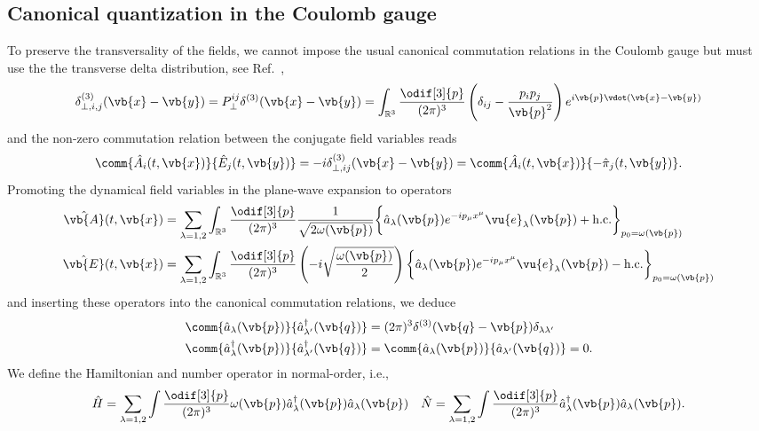 \subsection{Canonical quantization in the Coulomb gauge}

To preserve the transversality of the fields, we cannot impose the usual canonical commutation relations in the Coulomb gauge but must use the the transverse delta distribution, see Ref.~\cite[p.~197]{Greiner2013},
\begin{equation}
	\delta_{\perp,i,j}^{(3)}(\vb{x}-\vb{y})
	=
	P^{ij}_\perp
	\delta^{(3)}(\vb{x}-\vb{y})
	=
	\int_{\mathbb{R}^3}
	\frac{\odif[3]{p}}{(2\pi)^3}
	\left(
		\delta_{ij}
		-
		\frac{p_ip_j}{\vb{p}^2}
	\right)
	e^{i\vb{p}\vdot(\vb{x}-\vb{y})}
\end{equation}
and the non-zero commutation relation between the conjugate field variables reads
\begin{equation}
	\comm{\hat{A}_i(t,\vb{x})}{\hat{E}_j(t,\vb{y})}
	=
	-i
	\delta_{\perp,ij}^{(3)}(\vb{x}-\vb{y})
	=
	\comm{\hat{A}_i(t,\vb{x})}{-\hat\pi_j(t,\vb{y})}
	.
\end{equation}
Promoting the dynamical field variables in the plane-wave expansion to operators
\begin{align}
	\hat{\vb{A}}(t,\vb{x})
	&=
	\sum_{\lambda=1,2}
	\int_{\mathbb{R}^3}
	\frac{\odif[3]{p}}{(2\pi)^3}
	\frac{1}{\sqrt{2\omega(\vb{p})}}
	\biggl\{
		\hat{a}_{\lambda}(\vb{p})
		e^{-ip_\mu x^\mu}
		\vu{e}_\lambda(\vb{p})
		+
		\text{h.c.}
	\biggr\}_{p_0=\omega(\vb{p})}
	\\
	\hat{\vb{E}}(t,\vb{x})
	&=
	\sum_{\lambda=1,2}
	\int_{\mathbb{R}^3}
	\frac{\odif[3]{p}}{(2\pi)^3}
	\left(
		-i
		\sqrt{\frac{\omega(\vb{p})}{2}}
	\right)
	\biggl\{
		\hat{a}_{\lambda}(\vb{p})
		e^{-ip_\mu x^\mu}
		\vu{e}_\lambda(\vb{p})
		-
		\text{h.c.}
	\biggr\}_{p_0=\omega(\vb{p})}
\end{align}
and inserting these operators into the canonical commutation relations, we deduce
\begin{align}
	\comm{\hat{a}_\lambda(\vb{p})}{\hat{a}_{\lambda^\prime}^\dagger(\vb{q})}
	&=
	(2\pi)^3
	\delta^{(3)}(\vb{q}-\vb{p})
	\delta_{\lambda\lambda^\prime}
	\\
	\comm{\hat{a}_\lambda^\dagger(\vb{p})}{\hat{a}_{\lambda^\prime}^\dagger(\vb{q})}
	&=
	\comm{\hat{a}_\lambda(\vb{p})}{\hat{a}_{\lambda^\prime}(\vb{q})}
	=
	0
	.
\end{align}
We define the Hamiltonian and number operator in normal-order, i.e.,
\begin{align}
	\hat{H}
	=
	\sum_{\lambda=1,2}
	\int\frac{\odif[3]{p}}{(2\pi)^3}
	\omega(\vb{p})
	\hat{a}_\lambda^\dagger(\vb{p})
	\hat{a}_\lambda(\vb{p})
	&&
	\hat{N}
	=
	\sum_{\lambda=1,2}
	\int\frac{\odif[3]{p}}{(2\pi)^3}
	\hat{a}_\lambda^\dagger(\vb{p})
	\hat{a}_\lambda(\vb{p})
	.
\end{align}